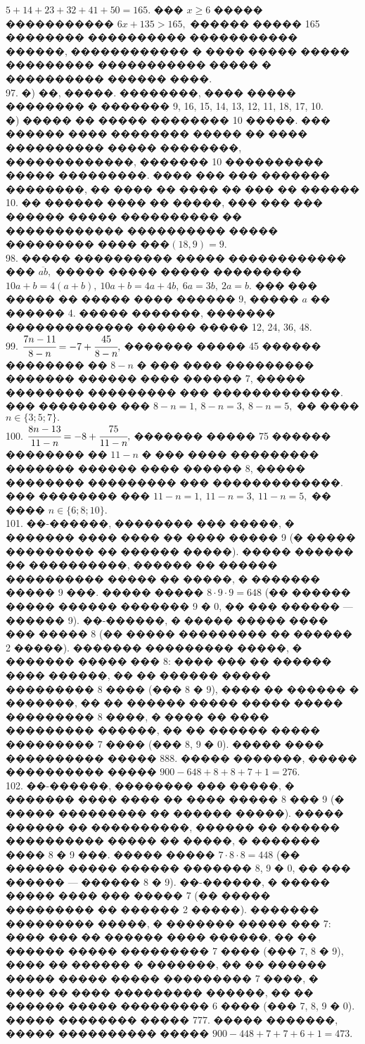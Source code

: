 \documentclass[12pt]{article}
\begin{document}
$5+14+23+32+41+50=165.$ ��� $x\geqslant6$ ����� ����������� $6x+135>165,$ ������ ����� 165 �������� ���������� ����������� ������, ������������ � ���� ����� ����� ��������� ����������� ����� � ���������� ������ ����.\\
97. �) ��, �����. ��������, ���� ����� �������� � ������� 9, 16, 15, 14, 13, 12, 11, 18, 17, 10.\\
�) ����� �� ����� �������� 10 �����. ��� ������ ���� �������� ����� �� ���� ���������� ����� ��������, �������������, ������� 10 ���������� ����� ���������. ���� ��� ��� ������� ��������, �� ���� �� ���� �� ��� �� ������ 10. �� ������ ���� �� �����, ��� ��� ��� ������ ����� ���������� �� ������������ ���������� ����� ��������� ���� ���$(18,9) = 9.$\\
98. ����� ���������� ����� ������������ ��� $\overline{ab},$ ����� ����� ����� ��������� $10a+b=4(a+b),\ 10a+b=4a+4b,\ 6a=3b,\ 2a=b.$ ��� ��� ����� �� ����� ���� ������ 9, ����� $a$ �� ������ 4. ����� �������, ������� ������������� ������ ����� 12, 24, 36, 48.\\
99. $\cfrac{7n-11}{8-n}=-7+\cfrac{45}{8-n},$ ������� ����� 45 ������ �������� �� $8-n$ � ��� ���� ��������� ������� ������ ���� ������ 7, ����� �������� ��������� ��� �������������. ��� �������� ��� $8-n=1,\ 8-n=3,\ 8-n=5,$ �� ���� $n\in\{3;5;7\}.$\\
100. $\cfrac{8n-13}{11-n}=-8+\cfrac{75}{11-n},$ ������� ����� 75 ������ �������� �� $11-n$ � ��� ���� ��������� ������� ������ ���� ������ 8, ����� �������� ��������� ��� �������������. ��� �������� ��� $11-n=1,\ 11-n=3,\ 11-n=5,$ �� ���� $n\in\{6;8;10\}.$\\
101. ��-������, �������� ��� �����, � ������� ���� ���� �� ���� ����� 9 (� ����� ��������� �� ������ �����). ����� ������ �� ����������, ������ �� ������ ���������� ����� �� �����, � ������� ����� 9 ���. ����� ����� $8\cdot9\cdot9=648$ (�� ������ ����� ������ ������� 9 � 0, �� ��� ������ --- ������ 9). ��-������, � ����� ����� ���� ��� ����� 8 (�� ����� ��������� �� ������ 2 �����). ������� ��������� �����, � ������� ����� ��� 8: ���� ��� �� ������ ���� ������, �� �� ������ ����� ��������� 8 ���� (��� 8 � 9), ���� �� ������ � �������, �� �� ������ ����� ����� ����� ��������� 8 ����, � ���� �� ���� ��������� ������, �� �� ������ ����� ��������� 7 ���� (��� 8, 9 � 0). ����� ���� ���������� ����� 888.
����� �������, ����� ���������� ����� $900-648+8+8+7+1=276.$\\
102. ��-������, �������� ��� �����, � ������� ���� ���� �� ���� ����� 8 ��� 9 (� ����� ��������� �� ������ �����). ����� ������ �� ����������, ������ �� ������ ���������� ����� �� �����, � ������� ���� 8 � 9 ���. ����� ����� $7\cdot8\cdot8=448$ (�� ������ ����� ������ ������� 8, 9 � 0, �� ��� ������ --- ������ 8 � 9). ��-������, � ����� ����� ���� ��� ����� 7 (�� ����� ��������� �� ������ 2 �����). ������� ��������� �����, � ������� ����� ��� 7: ���� ��� �� ������ ���� ������, �� �� ������ ����� ��������� 7 ���� (��� 7, 8 � 9), ���� �� ������ � �������, �� �� ������ ����� ����� ����� ��������� 7 ����, � ���� �� ���� ��������� ������, �� �� ������ ����� ��������� 6 ���� (��� 7, 8, 9 � 0). ����� �������� ����� 777.
����� �������, ����� ���������� ����� $900-448+7+7+6+1=473.$
\newpage
\end{document}
